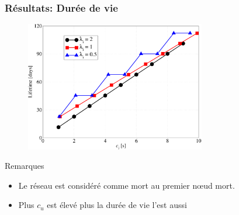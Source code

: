 \begin{frame}\frametitle{Résultats: Durée de vie}


  \begin{figure}[ht]
    \centering
    \includegraphics[width=0.7\textwidth]{figures/lifetime.pdf}
  \end{figure}

  \begin{block}{Remarques}
    \begin{itemize}
      \item Le réseau est considéré comme mort au premier nœud mort.
      \item Plus $c_u$ est élevé plus la durée de vie l'est aussi
    \end{itemize}
  \end{block}

\end{frame}

